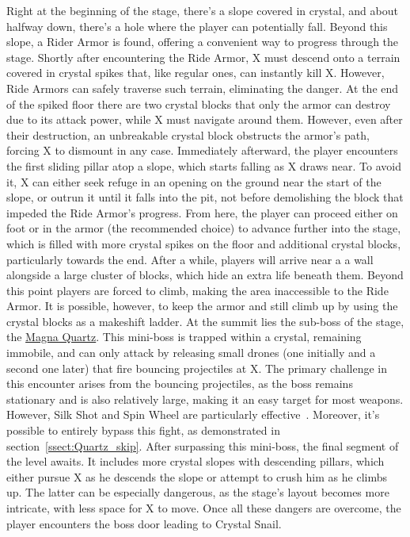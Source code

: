 Right at the beginning of the stage, there's a slope covered in crystal, and about halfway down, there's a hole where the player can potentially fall. Beyond this slope, a Rider Armor is found, offering a convenient way to progress through the stage. Shortly after encountering the Ride Armor, X must descend onto a terrain covered in crystal spikes that, like regular ones, can instantly kill X. However, Ride Armors can safely traverse such terrain, eliminating the danger. At the end of the spiked floor there are two crystal blocks that only the armor can destroy due to its attack power, while X must navigate around them. However, even after their destruction, an unbreakable crystal block obstructs the armor's path, forcing X to dismount in any case. Immediately afterward, the player encounters the first sliding pillar atop a slope, which starts falling as X draws near. To avoid it, X can either seek refuge in an opening on the ground near the start of the slope, or outrun it until it falls into the pit, not before demolishing the block that impeded the Ride Armor's progress. From here, the player can proceed either on foot or in the armor (the recommended choice) to advance further into the stage, which is filled with more crystal spikes on the floor and additional crystal blocks, particularly towards the end. After a while, players will arrive near a a wall alongside a large cluster of blocks, which hide an extra life beneath them. Beyond this point players are forced to climb, making the area inaccessible to the Ride Armor. It is possible, however, to keep the armor and still climb up by using the crystal blocks as a makeshift ladder. At the summit lies the sub-boss of the stage, the \hyperlink{miniboss:Magna_Quartz}{Magna Quartz}. This mini-boss is trapped within a crystal, remaining immobile, and can only attack by releasing small drones (one initially and a second one later) that fire bouncing projectiles at X. The primary challenge in this encounter arises from the bouncing projectiles, as the boss remains stationary and is also relatively large, making it an easy target for most weapons. However, Silk Shot and Spin Wheel are particularly effective~\cite{wiki:Magna_quartz}. Moreover, it's possible to entirely bypass this fight, as demonstrated in section~\ref{ssect:Quartz_skip}. After surpassing this mini-boss, the final segment of the level awaits. It includes more crystal slopes with descending pillars, which either pursue X as he descends the slope or attempt to crush him as he climbs up. The latter can be especially dangerous, as the stage's layout becomes more intricate, with less space for X to move. Once all these dangers are overcome, the player encounters the boss door leading to Crystal Snail.

